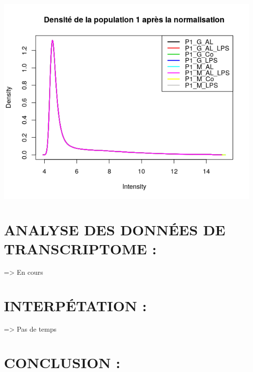 \documentclass[a4paper,10pt]{article}
\begin{document}
\begin{center}
 \includegraphics[scale=0.5]{../../R/output/Densitypop1C.png}
\end{center}

\section{ANALYSE DES DONN\'{E}ES DE TRANSCRIPTOME :}
=> En cours
\section{INTERP\'{E}TATION :}
=> Pas de temps
\section{CONCLUSION :}
\end{document}
